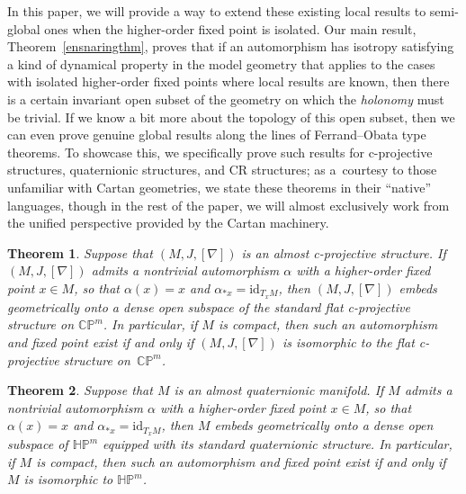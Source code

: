 \documentclass[pdftex]{sigma}
\numberwithin{equation}{section}
\newtheorem{mainthm}{Theorem}
\theoremstyle{definition}
\begin{document}
In this paper, we will provide a way to extend these existing local results to semi-global ones when the higher-order fixed point is isolated. Our main result, Theorem~\ref{ensnaringthm}, proves that if an automorphism has isotropy satisfying a kind of dynamical property in the model geometry that applies to the cases with isolated higher-order fixed points where local results are known, then there is a certain invariant open subset of the geometry on which the \emph{holonomy} must be trivial. If we know a bit more about the topology of this open subset, then we can even prove genuine global results along the lines of Ferrand--Obata type theorems. To showcase this, we specifically prove such results for c-projective structures, quaternionic structures, and CR structures; as a~courtesy to those unfamiliar with Cartan geometries, we state these theorems in their ``native'' languages, though in the rest of the paper, we will almost exclusively work from the unified perspective provided by the Cartan machinery.

\begin{mainthm}\label{thmA} Suppose that $(M,J,[\nabla])$ is an almost c-projective structure.
If $(M,J,[\nabla])$ admits a nontrivial automorphism $\alpha$ with a higher-order fixed point $x\in M$, so that $\alpha(x)=x$ and $\alpha_{*x}=\mathrm{id}_{T_xM}$, then $(M,J,[\nabla])$ embeds geometrically onto a dense open subspace of the standard flat c-projective structure on $\mathbb{CP}^m$. In particular, if $M$ is compact, then such an automorphism and fixed point exist if and only if $(M,J,[\nabla])$ is isomorphic to the flat c-projective structure on~$\mathbb{CP}^m$.\end{mainthm}

\begin{mainthm}\label{thmB} Suppose that $M$ is an almost quaternionic manifold. If $M$ admits a nontrivial automorphism $\alpha$ with a higher-order fixed point $x\in M$, so that $\alpha(x)=x$ and $\alpha_{*x}=\mathrm{id}_{T_xM}$, then $M$ embeds geometrically onto a dense open subspace of $\mathbb{HP}^m$ equipped with its standard quaternionic structure. In particular, if $M$ is compact, then such an automorphism and fixed point exist if and only if $M$ is isomorphic to $\mathbb{HP}^m$.\end{mainthm}
\end{document}
